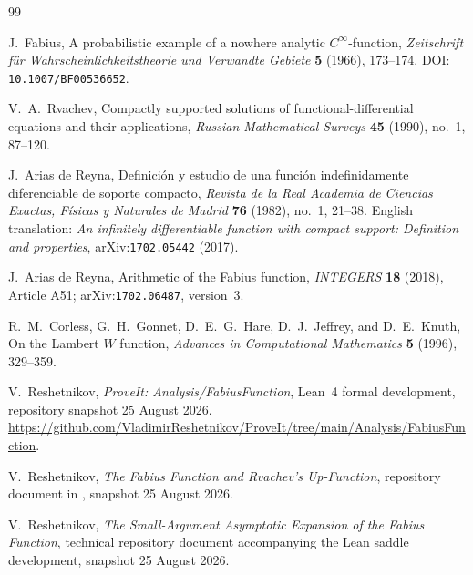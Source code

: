 \documentclass[11pt,oneside]{article}
\theoremstyle{definition}
\theoremstyle{remark}
\begin{document}
\renewcommand{\refname}{Dossier references}
\begin{thebibliography}{99}

J.~Fabius,
\newblock A probabilistic example of a nowhere analytic $C^\infty$-function,
\newblock \emph{Zeitschrift f\"ur Wahrscheinlichkeitstheorie und Verwandte
Gebiete} \textbf{5} (1966), 173--174.
\newblock DOI: \nolinkurl{10.1007/BF00536652}.

V.~A.~Rvachev,
\newblock Compactly supported solutions of functional-differential equations
and their applications,
\newblock \emph{Russian Mathematical Surveys} \textbf{45} (1990), no.~1,
87--120.

J.~Arias de Reyna,
\newblock Definici\'on y estudio de una funci\'on indefinidamente
diferenciable de soporte compacto,
\newblock \emph{Revista de la Real Academia de Ciencias Exactas, F\'isicas y
Naturales de Madrid} \textbf{76} (1982), no.~1, 21--38.
\newblock English translation:
\emph{An infinitely differentiable function with compact support:
Definition and properties}, arXiv:\nolinkurl{1702.05442} (2017).

J.~Arias de Reyna,
\newblock Arithmetic of the Fabius function,
\newblock \emph{INTEGERS} \textbf{18} (2018), Article A51;
arXiv:\nolinkurl{1702.06487}, version~3.

R.~M.~Corless, G.~H.~Gonnet, D.~E.~G.~Hare, D.~J.~Jeffrey, and D.~E.~Knuth,
\newblock On the Lambert $W$ function,
\newblock \emph{Advances in Computational Mathematics}
\textbf{5} (1996), 329--359.

V.~Reshetnikov,
\newblock \emph{ProveIt: Analysis/FabiusFunction},
\newblock Lean~4 formal development, repository snapshot 25 August 2026.
\newblock
\url{https://github.com/VladimirReshetnikov/ProveIt/tree/main/Analysis/FabiusFunction}.

V.~Reshetnikov,
\newblock \emph{The Fabius Function and Rvachev's Up-Function},
\newblock repository document in
,
snapshot 25 August 2026.

V.~Reshetnikov,
\newblock \emph{The Small-Argument Asymptotic Expansion of the Fabius
Function},
\newblock technical repository document accompanying the Lean saddle
development, snapshot 25 August 2026.

\end{thebibliography}
\end{document}
